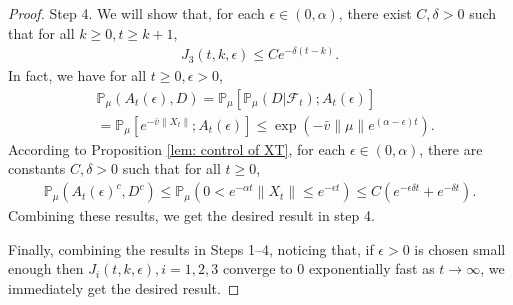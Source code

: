 \documentclass[12pt,a4paper]{amsart}
\theoremstyle{plain}
\theoremstyle{definition}
\numberwithin{equation}{section}
\begin{document}
\begin{proof}
    Step 4. We will show that, for each $\epsilon\in (0,  \alpha)$, there exist $C,\delta>0$ such that for all $k\geq0, t\geq k+1$,
\begin{equation}\begin{split}\label{ineq: control of J3}
 J_3(t,k,\epsilon)\leq Ce^{-\delta (t-k)}.
\end{split}\end{equation}
    In fact, we have  for all $t\geq 0, \epsilon >0$,
\begin{equation}\begin{split}
    &\mathbb P_{\mu}(A_{t}(\epsilon), D) = \mathbb P_{\mu}[\mathbb P_{\mu}(D|\mathscr F_t);A_t(\epsilon)]
    \\&= \mathbb P_\mu[e^{-\bar v\|X_t\|};A_t(\epsilon)]
    \leq \exp({-\bar v \|\mu\|e^{(\alpha - \epsilon)t}}).
\end{split}\end{equation}
According to Proposition \ref{lem: control of XT}, for each $\epsilon \in (0, \alpha)$, there are constants $C, \delta>0$ such that
for all $t\geq 0$,
\begin{equation}\begin{split}
    \mathbb P_\mu(A_t(\epsilon)^c,D^c) \leq   \mathbb P_\mu(0 < e^{-\alpha t}\|X_t\|\leq e^{ - \epsilon t}) \leq C (e^{-\epsilon \delta t}+e^{-\delta t}).
\end{split}\end{equation}
    Combining these results, we get the desired result in step 4.

    Finally, combining the results in Steps 1--4, noticing that, if $\epsilon>0$ is chosen small enough then $J_{i}(t,k,\epsilon), i = 1,2,3$ converge to $0$ exponentially fast as $t\rightarrow\infty$,
we immediately get the desired result.
\end{proof}
\end{document}
